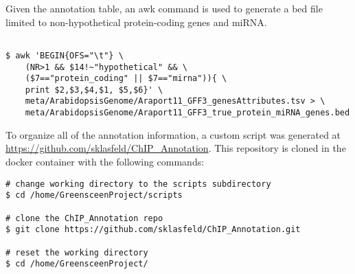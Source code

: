 \documentclass{article}
\begin{document}
\begin{sloppypar}
Given the annotation table, an awk command is used to generate a bed file limited to non-hypothetical protein-coding genes and miRNA.

\begin{verbatim}

$ awk 'BEGIN{OFS="\t"} \
    (NR>1 && $14!~"hypothetical" && \
    ($7=="protein_coding" || $7=="mirna")){ \
    print $2,$3,$4,$1, $5,$6}' \
    meta/ArabidopsisGenome/Araport11_GFF3_genesAttributes.tsv > \
    meta/ArabidopsisGenome/Araport11_GFF3_true_protein_miRNA_genes.bed
\end{verbatim}

To organize all of the annotation information, a custom script was generated at \url{https://github.com/sklasfeld/ChIP_Annotation}. This repository is cloned in the docker container with the following commands:
\begin{verbatim}
# change working directory to the scripts subdirectory
$ cd /home/GreensceenProject/scripts

# clone the ChIP_Annotation repo
$ git clone https://github.com/sklasfeld/ChIP_Annotation.git

# reset the working directory
$ cd /home/GreensceenProject/
\end{verbatim}


\end{sloppypar}
\end{document}
